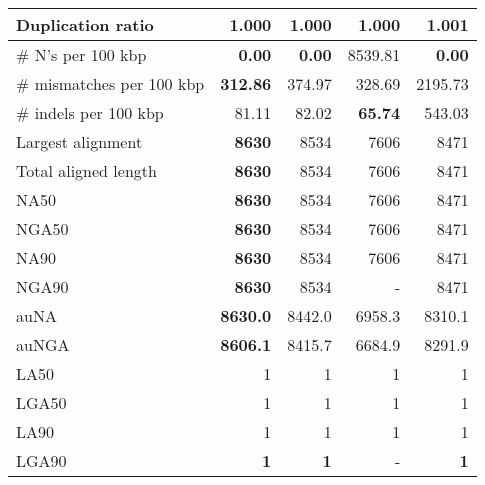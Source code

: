 \documentclass[12pt,a4paper]{article}
\begin{document}
\begin{table}[ht]
\begin{center}
\begin{tabular}{|l*{4}{|r}|}
Duplication ratio & {\bf 1.000} & {\bf 1.000} & {\bf 1.000} & 1.001 \\ \hline
\# N's per 100 kbp & {\bf 0.00} & {\bf 0.00} & 8539.81 & {\bf 0.00} \\ \hline
\# mismatches per 100 kbp & {\bf 312.86} & 374.97 & 328.69 & 2195.73 \\ \hline
\# indels per 100 kbp & 81.11 & 82.02 & {\bf 65.74} & 543.03 \\ \hline
Largest alignment & {\bf 8630} & 8534 & 7606 & 8471 \\ \hline
Total aligned length & {\bf 8630} & 8534 & 7606 & 8471 \\ \hline
NA50 & {\bf 8630} & 8534 & 7606 & 8471 \\ \hline
NGA50 & {\bf 8630} & 8534 & 7606 & 8471 \\ \hline
NA90 & {\bf 8630} & 8534 & 7606 & 8471 \\ \hline
NGA90 & {\bf 8630} & 8534 & - & 8471 \\ \hline
auNA & {\bf 8630.0} & 8442.0 & 6958.3 & 8310.1 \\ \hline
auNGA & {\bf 8606.1} & 8415.7 & 6684.9 & 8291.9 \\ \hline
LA50 & 1 & 1 & 1 & 1 \\ \hline
LGA50 & 1 & 1 & 1 & 1 \\ \hline
LA90 & 1 & 1 & 1 & 1 \\ \hline
LGA90 & {\bf 1} & {\bf 1} & - & {\bf 1} \\ \hline
\end{tabular}
\end{center}
\end{table}
\end{document}
